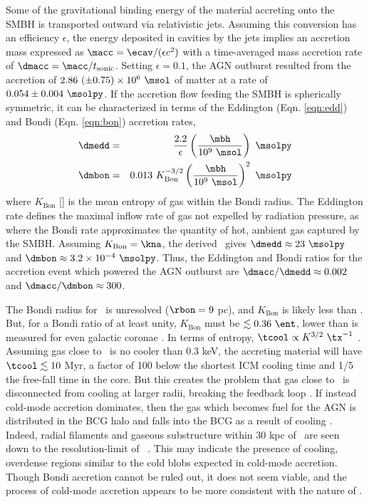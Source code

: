 \documentclass[useAMS,usenatbib]{mn2e}
\begin{document}
Some of the gravitational binding energy of the material accreting
onto the SMBH is transported outward via relativistic jets. Assuming
this conversion has an efficiency $\epsilon$, the energy deposited in
cavities by the jets implies an accretion mass expressed as $\macc =
\ecav/(\epsilon c^2)$ with a time-averaged mass accretion rate of
$\dmacc = \macc/t_{\mathrm{sonic}}$. Setting $\epsilon = 0.1$, the AGN
outburst resulted from the accretion of $2.86 ~(\pm 0.75) \times
10^{6} ~\msol$ of matter at a rate of $0.054 \pm 0.004 ~\msolpy$. If
the accretion flow feeding the SMBH is spherically symmetric, it can
be characterized in terms of the Eddington (Eqn. \ref{eqn:edd}) and
Bondi (Eqn. \ref{eqn:bon}) accretion rates,
\begin{eqnarray}
  \dmedd &=& \frac{2.2}{\epsilon} \left(\frac{\mbh}{10^9~\msol}\right)
  ~\msolpy  \label{eqn:edd}\\
  \dmbon &=& 0.013 ~K_{\mathrm{Bon}}^{-3/2} \left(\frac{\mbh}{10^9
    ~\msol}\right)^{2} ~\msolpy \label{eqn:bon}
\end{eqnarray}
where $K_{\mathrm{Bon}}$ [\ent] is the mean entropy of gas within the
Bondi radius. The Eddington rate defines the maximal inflow rate of
gas not expelled by radiation pressure, as where the Bondi rate
approximates the quantity of hot, ambient gas captured by the
SMBH. Assuming $K_{\mathrm{Bon}} = \kna$, the derived \mbh\ gives
$\dmedd \approx 23 ~\msolpy$ and $\dmbon \approx 3.2 \times 10^{-4}
~\msolpy$. Thus, the Eddington and Bondi ratios for the accretion
event which powered the AGN outburst are $\dmacc/\dmedd \approx 0.002$
and $\dmacc/\dmbon \approx 300$.

The Bondi radius for \irs\ is unresolved ($\rbon = 9$ pc), and
$K_{\mathrm{Bon}}$ is likely less than \kna. But, for a Bondi ratio of
at least unity, $K_{\mathrm{Bon}}$ must be $\la 0.36 ~\ent$, lower
than is measured for even galactic coronae \citep{coronae}. In terms
of entropy, $\tcool \propto K^{3/2} ~\tx^{-1}$ \citep{d06}. Assuming
gas close to \rbon\ is no cooler than 0.3 keV, the accreting material
will have $\tcool \la 10$ Myr, a factor of 100 below the shortest ICM
cooling time and 1/5 the free-fall time in the core. But this creates
the problem that gas close to \rbon\ is disconnected from cooling at
larger radii, breaking the feedback loop
\citep{2006NewA...12...38S}. If instead cold-mode accretion dominates,
then the gas which becomes fuel for the AGN is distributed in the BCG
halo and falls into the BCG as a result of cooling \citep{pizzolato05,
  2010arXiv1003.4181P}. Indeed, radial filaments and gaseous
substructure within 30 kpc of \irs\ are seen down to the
resolution-limit of \hst\ \citep{1999Ap&SS.266..113A}. This may
indicate the presence of cooling, overdense regions similar to the
cold blobs expected in cold-mode accretion. Though Bondi accretion
cannot be ruled out, it does not seem viable, and the process of
cold-mode accretion appears to be more consistent with the nature of
\irs.
\end{document}
